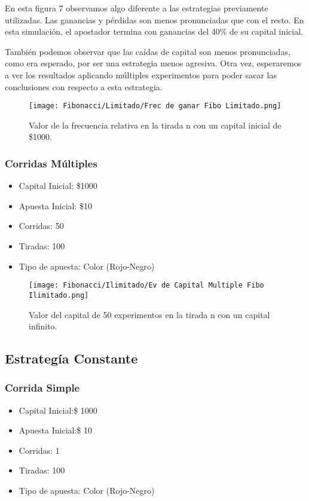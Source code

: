 \documentclass{article}
\begin{document}
En esta figura 7 observamos algo diferente a las estrategias previamente utilizadas. Las ganancias y pérdidas son menos pronunciadas que con el resto. En esta simulación, el apostador termina con ganancias del 40\% de su capital inicial.

También podemos observar que las caídas de capital son menos pronunciadas, como era esperado, por ser una estrategia menos agresiva. Otra vez, esperaremos a ver los resultados aplicando múltiples experimentos para poder sacar las conclusiones con respecto a esta estrategia.

    \begin{figure} [h]
        \centering
            \texttt{[image: Fibonacci/Limitado/Frec de ganar Fibo Limitado.png]}
            \caption{Valor de la frecuencia relativa en la tirada n con un capital inicial de \$1000.}
            \label{fig:grafico}
    \end{figure}

\subsubsection{Corridas Múltiples}
\begin{itemize}
\item Capital Inicial: \$1000
\item Apuesta Inicial: \$10
\item Corridas: 50
\item Tiradas: 100
\item Tipo de apuesta: Color (Rojo-Negro)
\end{itemize}
\begin{figure}
    \centering
    \texttt{[image: Fibonacci/Ilimitado/Ev de Capital Multiple Fibo Ilimitado.png]}
    \caption{Valor del capital de 50 experimentos en la tirada n con un capital infinito.}
    \label{fig:enter-label}
\end{figure}


\subsection{Estrategía Constante}
\subsubsection{Corrida Simple}

\begin{itemize}
\item Capital Inicial:\$ 1000
\item Apuesta Inicial:\$ 10
\item Corridas: 1
\item Tiradas: 100
\item Tipo de apuesta: Color (Rojo-Negro)
\end{itemize}
\end{document}
